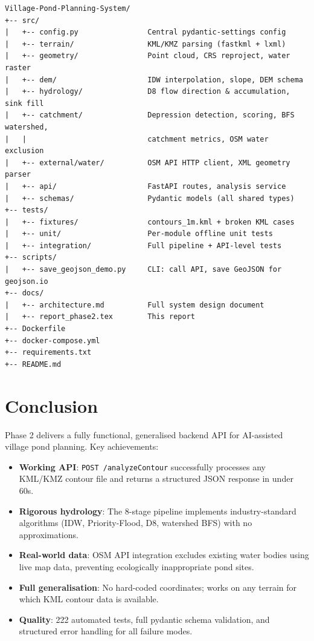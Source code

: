 \documentclass[12pt,a4paper]{article}
\begin{document}
\begin{verbatim}
Village-Pond-Planning-System/
+-- src/
|   +-- config.py                Central pydantic-settings config
|   +-- terrain/                 KML/KMZ parsing (fastkml + lxml)
|   +-- geometry/                Point cloud, CRS reproject, water raster
|   +-- dem/                     IDW interpolation, slope, DEM schema
|   +-- hydrology/               D8 flow direction & accumulation, sink fill
|   +-- catchment/               Depression detection, scoring, BFS watershed,
|   |                            catchment metrics, OSM water exclusion
|   +-- external/water/          OSM API HTTP client, XML geometry parser
|   +-- api/                     FastAPI routes, analysis service
|   +-- schemas/                 Pydantic models (all shared types)
+-- tests/
|   +-- fixtures/                contours_1m.kml + broken KML cases
|   +-- unit/                    Per-module offline unit tests
|   +-- integration/             Full pipeline + API-level tests
+-- scripts/
|   +-- save_geojson_demo.py     CLI: call API, save GeoJSON for geojson.io
+-- docs/
|   +-- architecture.md          Full system design document
|   +-- report_phase2.tex        This report
+-- Dockerfile
+-- docker-compose.yml
+-- requirements.txt
+-- README.md
\end{verbatim}

\section{Conclusion}

Phase 2 delivers a fully functional, generalised backend API for AI-assisted village
pond planning. Key achievements:

\begin{itemize}
    \item \textbf{Working API}: \texttt{POST /analyzeContour} successfully processes
          any KML/KMZ contour file and returns a structured JSON response in under 60s.
    \item \textbf{Rigorous hydrology}: The 8-stage pipeline implements industry-standard
          algorithms (IDW, Priority-Flood, D8, watershed BFS) with no approximations.
    \item \textbf{Real-world data}: OSM API integration excludes existing water bodies
          using live map data, preventing ecologically inappropriate pond sites.
    \item \textbf{Full generalisation}: No hard-coded coordinates; works on any terrain
          for which KML contour data is available.
    \item \textbf{Quality}: 222 automated tests, full pydantic schema validation, and
          structured error handling for all failure modes.
\end{itemize}
\end{document}
